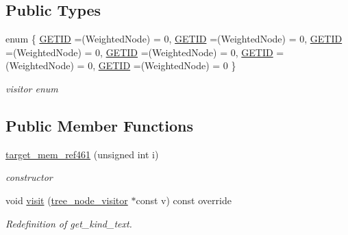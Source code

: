 \subsection*{Public Types}
\begin{DoxyCompactItemize}
\item 
enum \{ \newline
\hyperlink{structtarget__mem__ref461_ac8c49af34df2d8320711006226118baca57469b2b80f5a29bb3497fcdc5345d3a}{G\+E\+T\+ID} =(Weighted\+Node) = 0, 
\hyperlink{structtarget__mem__ref461_ac8c49af34df2d8320711006226118baca57469b2b80f5a29bb3497fcdc5345d3a}{G\+E\+T\+ID} =(Weighted\+Node) = 0, 
\hyperlink{structtarget__mem__ref461_ac8c49af34df2d8320711006226118baca57469b2b80f5a29bb3497fcdc5345d3a}{G\+E\+T\+ID} =(Weighted\+Node) = 0, 
\hyperlink{structtarget__mem__ref461_ac8c49af34df2d8320711006226118baca57469b2b80f5a29bb3497fcdc5345d3a}{G\+E\+T\+ID} =(Weighted\+Node) = 0, 
\newline
\hyperlink{structtarget__mem__ref461_ac8c49af34df2d8320711006226118baca57469b2b80f5a29bb3497fcdc5345d3a}{G\+E\+T\+ID} =(Weighted\+Node) = 0, 
\hyperlink{structtarget__mem__ref461_ac8c49af34df2d8320711006226118baca57469b2b80f5a29bb3497fcdc5345d3a}{G\+E\+T\+ID} =(Weighted\+Node) = 0
 \}\begin{DoxyCompactList}\small\item\em visitor enum \end{DoxyCompactList}
\end{DoxyCompactItemize}
\subsection*{Public Member Functions}
\begin{DoxyCompactItemize}
\item 
\hyperlink{structtarget__mem__ref461_ab764a2aea5d137a6b5c61023d2378c3e}{target\+\_\+mem\+\_\+ref461} (unsigned int i)
\begin{DoxyCompactList}\small\item\em constructor \end{DoxyCompactList}\item 
void \hyperlink{structtarget__mem__ref461_af45ee8b7f6831742eb9108a5987d871e}{visit} (\hyperlink{classtree__node__visitor}{tree\+\_\+node\+\_\+visitor} $\ast$const v) const override
\begin{DoxyCompactList}\small\item\em Redefinition of get\+\_\+kind\+\_\+text. \end{DoxyCompactList}\end{DoxyCompactItemize}
